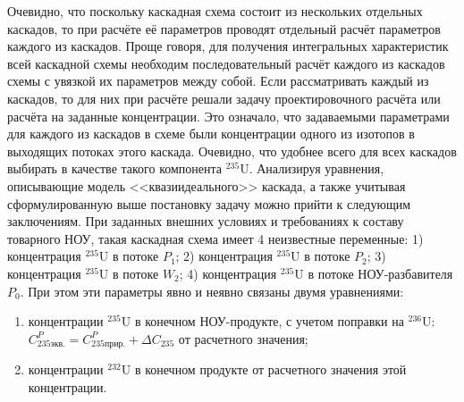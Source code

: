 Очевидно, что поскольку каскадная схема состоит из нескольких отдельных каскадов, то при расчёте её параметров проводят отдельный расчёт параметров каждого из каскадов. Проще говоря, для получения интегральных характеристик всей каскадной схемы необходим последовательный расчёт каждого из каскадов схемы с увязкой их параметров между собой. Если рассматривать каждый из каскадов, то для них при расчёте решали задачу проектировочного расчёта или расчёта на заданные концентрации. Это означало, что задаваемыми параметрами для каждого из каскадов в схеме были концентрации одного из изотопов в выходящих потоках этого каскада. Очевидно, что удобнее всего для всех каскадов выбирать в качестве такого компонента $^{235}$U.
Анализируя уравнения, описывающие модель <<квазиидеального>> каскада, а также учитывая сформулированную выше постановку задачу можно прийти к следующим заключениям. При заданных внешних условиях и требованиях к составу товарного НОУ, такая каскадная схема имеет 4 неизвестные переменные: 1) концентрация $^{235}$U в потоке $P_{1}$; 2) концентрация $^{235}$U в потоке $P_{2}$; 3) концентрация $^{235}$U в потоке $W_{2}$; 4) концентрация $^{235}$U в потоке НОУ-разбавителя $P_{0}$. При этом эти параметры явно и неявно связаны двумя уравнениями:

\begin{enumerate}
    \item концентрации $^{235}$U в  конечном НОУ-продукте, с учетом поправки на $^{236}$U: $C_{235 экв.}^{P}=C_{235 прир.}^{P}+\Delta C_{235}$ от расчетного значения;
    \item концентрации $^{232}$U в конечном продукте от расчетного значения этой концентрации.
\end{enumerate}

